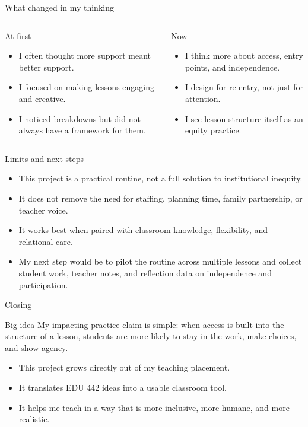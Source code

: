 \documentclass[aspectratio=169,11pt]{beamer}
\newcommand{\claimbox}[1]{
  \begin{block}{Big idea}
  \Large #1
  \end{block}
}
\begin{document}
\begin{frame}{What changed in my thinking}
\begin{columns}[T]
  \begin{block}{At first}
  \begin{itemize}
    \item I often thought more support meant better support.
    \item I focused on making lessons engaging and creative.
    \item I noticed breakdowns but did not always have a framework for them.
  \end{itemize}
  \end{block}

  \begin{block}{Now}
  \begin{itemize}
    \item I think more about access, entry points, and independence.
    \item I design for re-entry, not just for attention.
    \item I see lesson structure itself as an equity practice.
  \end{itemize}
  \end{block}
\end{columns}
\end{frame}

\begin{frame}{Limits and next steps}
\begin{itemize}
  \item This project is a practical routine, not a full solution to institutional inequity.
  \item It does not remove the need for staffing, planning time, family partnership, or teacher voice.
  \item It works best when paired with classroom knowledge, flexibility, and relational care.
  \item My next step would be to pilot the routine across multiple lessons and collect student work, teacher notes, and reflection data on independence and participation.
\end{itemize}
\end{frame}

\begin{frame}{Closing}
\claimbox{My impacting practice claim is simple: when access is built into the structure of a lesson, students are more likely to stay in the work, make choices, and show agency.}

\vspace{0.2cm}
\begin{itemize}
  \item This project grows directly out of my teaching placement.
  \item It translates EDU 442 ideas into a usable classroom tool.
  \item It helps me teach in a way that is more inclusive, more humane, and more realistic.
\end{itemize}
\end{frame}
\end{document}
